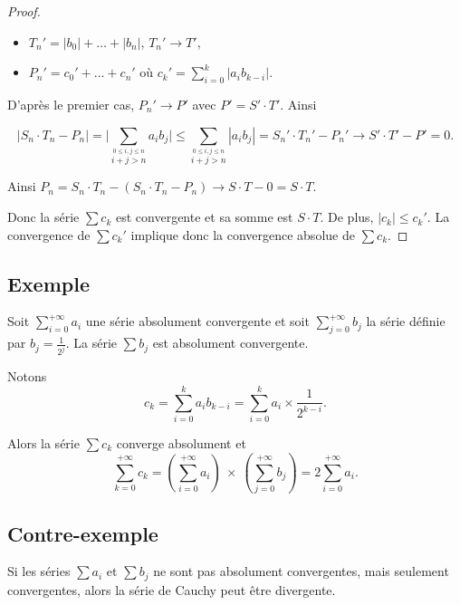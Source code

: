 \documentclass[class=report,crop=false]{standalone}
\begin{document}
\begin{proof}
\begin{itemize}
  \item $T_n'=|b_0|+\dots+|b_n|$, $T_n'\to T'$,
  
  \item $P_n'= c_0'+\dots+ c_n'$ o\`u $c_k'=\sum_{i=0}^k|a_ib_{k-i}|$.
\end{itemize}


D'après le premier cas, $P_n'\to P'$ avec $P'=S' \cdot T'$. Ainsi

$$|S_n \cdot T_n - P_n|= \bigl|\sum_{\stackrel{0\le i,j\le n}{i+j>n}} a_ib_j\bigr|\le
\sum_{\stackrel{0\le i,j\le n}{i+j>n}} |a_ib_j| = S_n' \cdot T_n'-P_n' \to S' \cdot T'-P'=0.
$$

Ainsi $P_n=S_n \cdot T_n-(S_n \cdot T_n-P_n)\to S \cdot T-0=S \cdot T$.

Donc la série $\sum c_k$ est convergente et sa somme est $S \cdot T$. 
De plus, $|c_k|\le c_k'$. La convergence de $\sum c_k'$ implique 
donc la convergence absolue de $\sum c_k$.
\end{proof}

\subsection{Exemple}

\begin{exemple}
Soit $\sum_{i=0}^{+\infty} a_i$ une série absolument convergente
et soit $\sum_{j=0}^{+\infty} b_j$ la série définie par $b_j = \frac{1}{2^j}$.
La série $\sum b_j$ est absolument convergente.

Notons
$$c_k = \sum_{i=0}^k a_ib_{k-i} = \sum_{i=0}^k a_i \times \frac{1}{2^{k-i}}.$$

Alors la série $\sum c_k$ converge absolument et
$$\sum_{k=0}^{+\infty} c_k 
= \left(\sum_{i=0}^{+\infty} a_i\right)\ \times\ \left(\sum_{j=0}^{+\infty} b_j\right)
= 2 \sum_{i=0}^{+\infty} a_i.$$
\end{exemple}

\subsection{Contre-exemple}

Si les séries $\sum a_i$ et $\sum b_j$ ne sont pas absolument 
convergentes, mais seulement convergentes,
alors la série de Cauchy peut être divergente.
\end{document}
